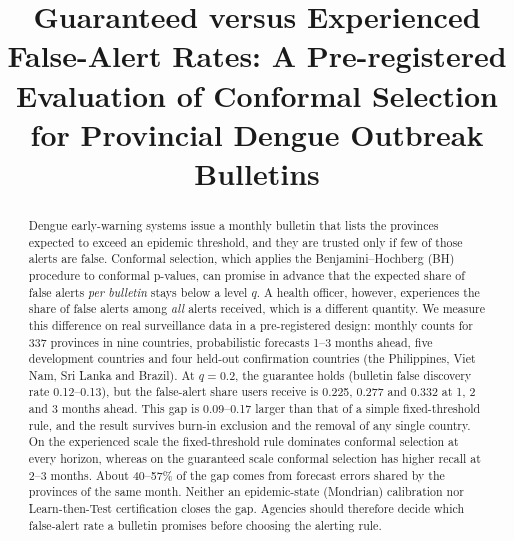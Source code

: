 \documentclass[conference]{IEEEtran}
\begin{document}
\nocite{ansari2025chronos2,clarke2024opendengue,jin2023selection,bates2023,hussain2018ewars,ke2017lightgbm,lowe2016,%
sun2007,genovese2002,bortman1999,benjamini1995,%
angelopoulos2021ltt,waudbysmith2024,angelopoulos2024crc,barber2023,colon2021vietnam,bracher2021,gibbs2021,zrnic2020,%
johansson2019,javanmard2018,vovk2005,storey2003,benjamini2001}

\title{Guaranteed versus Experienced False-Alert Rates: A Pre-registered Evaluation of Conformal Selection for Provincial Dengue Outbreak Bulletins}

\author{
}


\maketitle

\begin{abstract}
Dengue early-warning systems issue a monthly bulletin that lists the provinces expected to exceed an epidemic threshold, and they are trusted only if few of those alerts are false. Conformal selection, which applies the Benjamini--Hochberg (BH) procedure to conformal p-values, can promise in advance that the expected share of false alerts \emph{per bulletin} stays below a level $q$. A health officer, however, experiences the share of false alerts among \emph{all} alerts received, which is a different quantity. We measure this difference on real surveillance data in a pre-registered design: monthly counts for 337 provinces in nine countries, probabilistic forecasts 1--3 months ahead, five development countries and four held-out confirmation countries (the Philippines, Viet Nam, Sri Lanka and Brazil). At $q=0.2$, the guarantee holds (bulletin false discovery rate 0.12--0.13), but the false-alert share users receive is 0.225, 0.277 and 0.332 at 1, 2 and 3 months ahead. This gap is 0.09--0.17 larger than that of a simple fixed-threshold rule, and the result survives burn-in exclusion and the removal of any single country. On the experienced scale the fixed-threshold rule dominates conformal selection at every horizon, whereas on the guaranteed scale conformal selection has higher recall at 2--3 months. About 40--57\% of the gap comes from forecast errors shared by the provinces of the same month. Neither an epidemic-state (Mondrian) calibration nor Learn-then-Test certification closes the gap. Agencies should therefore decide which false-alert rate a bulletin promises before choosing the alerting rule.
\end{abstract}
\end{document}
